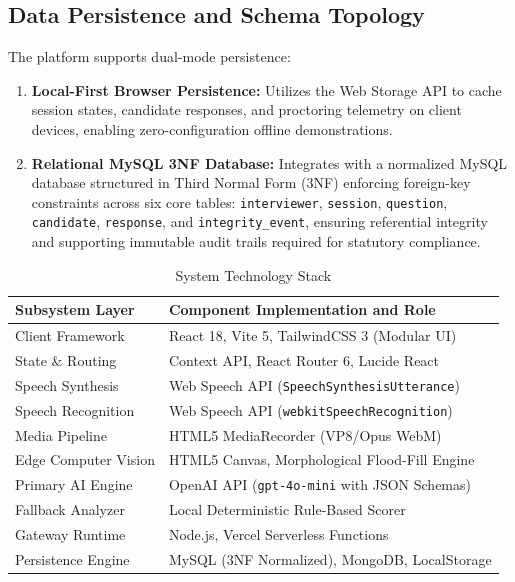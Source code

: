 \documentclass[conference]{IEEEtran}
\begin{document}
\subsection{Data Persistence and Schema Topology}

The platform supports dual-mode persistence:
\begin{enumerate}
    \item \textbf{Local-First Browser Persistence:} Utilizes the Web Storage API to cache session states, candidate responses, and proctoring telemetry on client devices, enabling zero-configuration offline demonstrations.
    \item \textbf{Relational MySQL 3NF Database:} Integrates with a normalized MySQL database structured in Third Normal Form (3NF) enforcing foreign-key constraints across six core tables: \texttt{interviewer}, \texttt{session}, \texttt{question}, \texttt{candidate}, \texttt{response}, and \texttt{integrity\_event}, ensuring referential integrity and supporting immutable audit trails required for statutory compliance.
\end{enumerate}

\begin{table}[htbp]
\caption{System Technology Stack}
\label{tab:technology}
\centering
\renewcommand{\arraystretch}{1.2}
\begin{tabular}{p{}p{}}
\toprule
\textbf{Subsystem Layer} & \textbf{Component Implementation and Role}\\
\midrule
Client Framework & React 18, Vite 5, TailwindCSS 3 (Modular UI)\\
State \& Routing & Context API, React Router 6, Lucide React\\
Speech Synthesis & Web Speech API (\texttt{SpeechSynthesisUtterance})\\
Speech Recognition & Web Speech API (\texttt{webkitSpeechRecognition})\\
Media Pipeline & HTML5 MediaRecorder (VP8/Opus WebM)\\
Edge Computer Vision & HTML5 Canvas, Morphological Flood-Fill Engine\\
Primary AI Engine & OpenAI API (\texttt{gpt-4o-mini} with JSON Schemas)\\
Fallback Analyzer & Local Deterministic Rule-Based Scorer\\
Gateway Runtime & Node.js, Vercel Serverless Functions\\
Persistence Engine & MySQL (3NF Normalized), MongoDB, LocalStorage\\
\bottomrule
\end{tabular}
\end{table}
\end{document}

